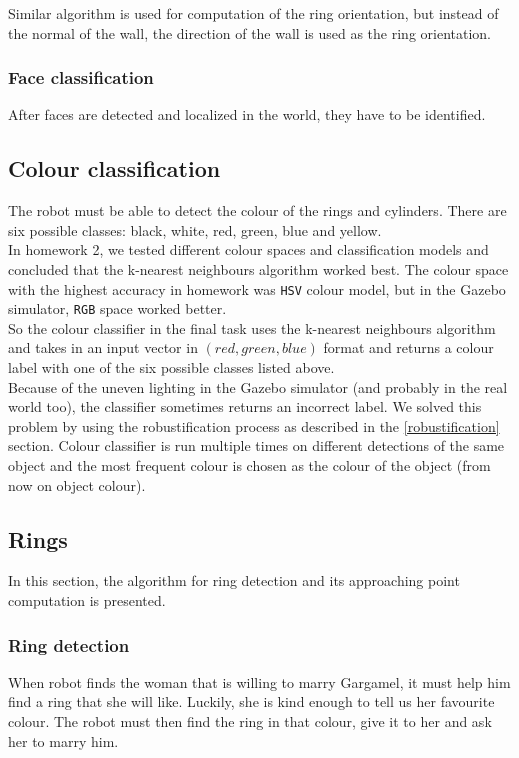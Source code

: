 \documentclass[12pt,a4paper]{article}
\begin{document}
	Similar algorithm is used for computation of the ring orientation, but instead of the normal of the wall, the direction of the wall is used as the ring orientation. \\
	
	\subsubsection{Face classification}
	After faces are detected and localized in the world, they have to be identified.
	
	\subsection{Colour classification} \label{colour_classification}
	The robot must be able to detect the colour of the rings and cylinders. There are six possible classes: black, white, red, green, blue and yellow. \\
	
	In homework 2, we tested different colour spaces and classification models and concluded that the k-nearest neighbours algorithm worked best. The colour space with the highest accuracy in homework was \texttt{HSV} colour model, but in the Gazebo simulator, \texttt{RGB} space worked better. \\
	
	So the colour classifier in the final task uses the k-nearest neighbours algorithm and takes in an input vector in $(red, green, blue)$ format and returns a colour label with one of the six possible classes listed above. \\
	
	Because of the uneven lighting in the Gazebo simulator (and probably in the real world too), the classifier sometimes returns an incorrect label. We solved this problem by using the robustification process as described in the \ref{robustification} section. Colour classifier is run multiple times on different detections of the same object and the most frequent colour is chosen as the colour of the object (from now on object colour). \\
	
	\subsection{Rings}
	In this section, the algorithm for ring detection and its approaching point computation is presented.
	
	\subsubsection{Ring detection} \label{ring_detection}
	When robot finds the woman that is willing to marry Gargamel, it must help him find a ring that she will like. Luckily, she is kind enough to tell us her favourite colour. The robot must then find the ring in that colour, give it to her and ask her to marry him. \\
	
\end{document}
